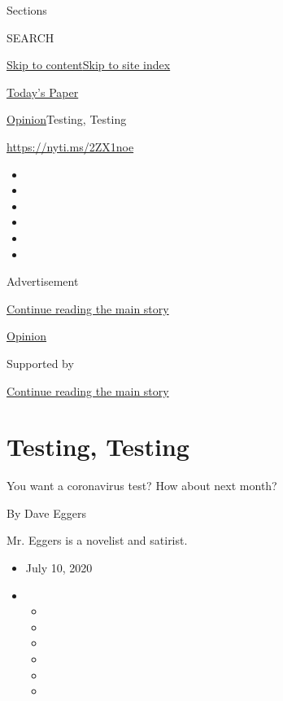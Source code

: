 Sections

SEARCH

\protect\hyperlink{site-content}{Skip to
content}\protect\hyperlink{site-index}{Skip to site index}

\href{https://myaccount.nytimes.com/auth/login?response_type=cookie\&client_id=vi}{}

\href{https://www.nytimes.com/section/todayspaper}{Today's Paper}

\href{/section/opinion}{Opinion}\textbar{}Testing, Testing

\href{https://nyti.ms/2ZX1noe}{https://nyti.ms/2ZX1noe}

\begin{itemize}
\item
\item
\item
\item
\item
\item
\end{itemize}

Advertisement

\protect\hyperlink{after-top}{Continue reading the main story}

\href{/section/opinion}{Opinion}

Supported by

\protect\hyperlink{after-sponsor}{Continue reading the main story}

\hypertarget{testing-testing}{%
\section{Testing, Testing}\label{testing-testing}}

You want a coronavirus test? How about next month?

By Dave Eggers

Mr. Eggers is a novelist and satirist.

\begin{itemize}
\item
  July 10, 2020
\item
  \begin{itemize}
  \item
  \item
  \item
  \item
  \item
  \item
  \end{itemize}
\end{itemize}

